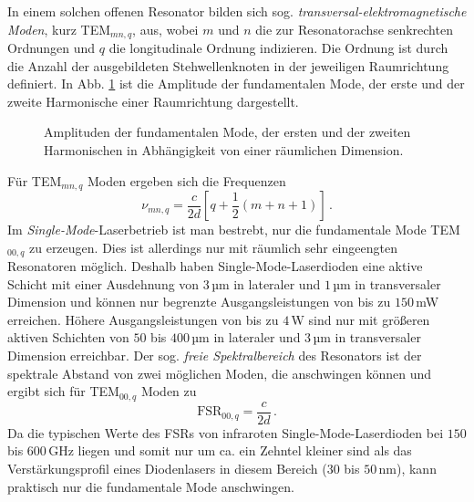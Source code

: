 In einem solchen offenen Resonator bilden sich sog.
\textit{transversal-elektromagnetische Moden}, kurz TEM$_{mn,q}$, aus, wobei $m$
und $n$ die zur Resonatorachse senkrechten Ordnungen und $q$ die longitudinale
Ordnung indizieren. Die Ordnung ist durch die Anzahl der ausgebildeten
Stehwellenknoten in der jeweiligen Raumrichtung definiert. In
Abb. \ref{fig:TEM-moden} ist die Amplitude der fundamentalen Mode, der erste und
der zweite Harmonische einer Raumrichtung dargestellt.
\begin{figure}[h]
	\centering
	\footnotesize
	
	\caption[Räumliche Moden im Resonator]{Amplituden der
	fundamentalen Mode, der ersten und der zweiten Harmonischen in Abhängigkeit von einer
	räumlichen Dimension.}
	\label{fig:TEM-moden}
\end{figure}
Für TEM$_{mn,q}$ Moden ergeben sich die Frequenzen
\begin{equation}\label{eq:TEM-moden_frequenz}
	\nu_{mn,q}=\frac{c}{2d}\left[q+\frac{1}{2}(m+n+1)\right]\,.
\end{equation}
Im \textit{Single-Mode}-Laserbetrieb ist man bestrebt, nur die fundamentale Mode
TEM$_{00,q}$ zu erzeugen. Dies ist allerdings nur mit räumlich sehr eingeengten
Resonatoren möglich. Deshalb haben Single-Mode-Laserdioden eine aktive
Schicht mit einer Ausdehnung von $3\,$µm in lateraler und $1\,$µm in
transversaler Dimension und können nur begrenzte Ausgangsleistungen von bis zu
$150\,$mW erreichen. Höhere Ausgangsleistungen von bis zu $4\,$W sind nur mit
größeren aktiven Schichten von $50$ bis $400\,$µm in lateraler und $3\,$µm in transversaler Dimension
erreichbar.
Der sog. \textit{freie Spektralbereich} des Resonators ist der spektrale Abstand
von zwei möglichen Moden, die anschwingen können und ergibt sich für
TEM$_{00,q}$ Moden zu
\begin{equation}\label{eq:FSR_TEM-moden}
	\text{FSR}_{00,q}=\frac{c}{2d}\,.
\end{equation}
Da die typischen Werte des FSRs von infraroten Single-Mode-Laserdioden bei $150$
bis $600\,$GHz liegen und somit nur um ca. ein Zehntel kleiner sind als das
Verstärkungsprofil eines Diodenlasers in diesem Bereich ($30$ bis $50\,$nm), kann praktisch nur die fundamentale Mode anschwingen.

